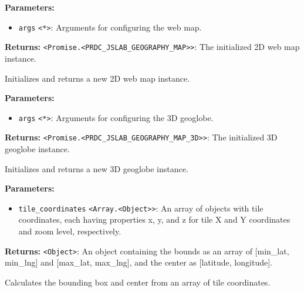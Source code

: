 \documentclass[12pt,a4paper]{article}
\begin{document}
\noindent \textbf{Parameters:}
\begin{itemize}
  \item \texttt{args} \texttt{<*>}: Arguments for configuring the web map.
\end{itemize}

\noindent \textbf{Returns:} \texttt{<Promise.<PRDC\_JSLAB\_GEOGRAPHY\_MAP>>}: The initialized 2D web map instance.

\noindent Initializes and returns a new 2D web map instance.

\vspace{5mm}
\noindent {}


\noindent \textbf{Parameters:}
\begin{itemize}
  \item \texttt{args} \texttt{<*>}: Arguments for configuring the 3D geoglobe.
\end{itemize}

\noindent \textbf{Returns:} \texttt{<Promise.<PRDC\_JSLAB\_GEOGRAPHY\_MAP\_3D>>}: The initialized 3D geoglobe instance.

\noindent Initializes and returns a new 3D geoglobe instance.

\vspace{5mm}
\noindent {}


\noindent \textbf{Parameters:}
\begin{itemize}
  \item \texttt{tile\_coordinates} \texttt{<Array.<Object>>}: An array of objects with tile coordinates, each having properties \textasciigrave{}x\textasciigrave{}, \textasciigrave{}y\textasciigrave{}, and \textasciigrave{}z\textasciigrave{} for tile X and Y coordinates and zoom level, respectively.
\end{itemize}

\noindent \textbf{Returns:} \texttt{<Object>}: An object containing the bounds as an array of \textasciigrave{}[min\_lat, min\_lng]\textasciigrave{} and \textasciigrave{}[max\_lat, max\_lng]\textasciigrave{}, and the center as \textasciigrave{}[latitude, longitude]\textasciigrave{}.

\noindent Calculates the bounding box and center from an array of tile coordinates.
\end{document}
